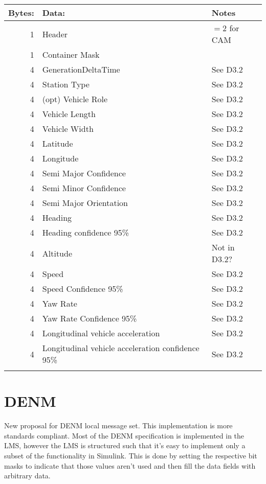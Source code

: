 \documentclass[11pt]{article}
\begin{document}
\begin{center}
\begin{tabular}{rll}
\hline
Bytes: & Data: & Notes\\
\hline
1 & Header & \(=2\) for CAM\\
1 & Container Mask & \\
4 & GenerationDeltaTime & See D3.2\\
4 & Station Type & See D3.2\\
4 & (opt) Vehicle Role & See D3.2\\
4 & Vehicle Length & See D3.2\\
4 & Vehicle Width & See D3.2\\
4 & Latitude & See D3.2\\
4 & Longitude & See D3.2\\
4 & Semi Major Confidence & See D3.2\\
4 & Semi Minor Confidence & See D3.2\\
4 & Semi Major Orientation & See D3.2\\
4 & Heading & See D3.2\\
4 & Heading confidence 95\% & See D3.2\\
4 & Altitude & Not in D3.2?\\
4 & Speed & See D3.2\\
4 & Speed Confidence 95\% & See D3.2\\
4 & Yaw Rate & See D3.2\\
4 & Yaw Rate Confidence 95\% & See D3.2\\
4 & Longitudinal vehicle acceleration & See D3.2\\
4 & Longitudinal vehicle acceleration confidence 95\% & See D3.2\\
 &  & \\
\end{tabular}
\end{center}


\newpage
\section{DENM}
\label{sec:orgheadline3}
New proposal for DENM local message set. This implementation is more
standards compliant. Most of the DENM specification is implemented in
the LMS, however the LMS is structured such that it's easy to
implement only a subset of the functionality in Simulink. This is done
by setting the respective bit masks to indicate that those values
aren't used and then fill the data fields with arbitrary data.
\end{document}
